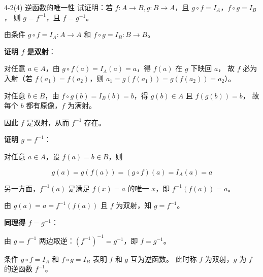 \documentclass[11pt]{article}
\begin{document}

\begin{question}{4-2(4) 逆函数的唯一性}
  试证明：若 $f: A \to B, g: B \to A$，且 $g \circ f = I_A$，$f \circ g = I_B$，
  则 $g = f^{-1}$，且 $f = g^{-1}$。

  \begin{answer}
    由条件 $g \circ f = I_A: A \to A$ 和 $f \circ g = I_B: B \to B$。

    \vspace{0.5em}
    \textbf{证明 $f$ 是双射}：

    对任意 $a \in A$，由 $g \circ f(a) = I_A(a) = a$，得 $f(a)$ 在 $g$ 下映回 $a$，
    故 $f$ 必为入射（若 $f(a_1) = f(a_2)$，则 $a_1 = g(f(a_1)) = g(f(a_2)) = a_2$）。

    对任意 $b \in B$，由 $f \circ g(b) = I_B(b) = b$，得 $g(b) \in A$ 且 $f(g(b)) = b$，
    故每个 $b$ 都有原像，$f$ 为满射。

    因此 $f$ 是双射，从而 $f^{-1}$ 存在。

    \vspace{0.5em}
    \textbf{证明 $g = f^{-1}$}：

    对任意 $a \in A$，设 $f(a) = b \in B$，则

    $$g(a) = g(f(a)) = (g \circ f)(a) = I_A(a) = a$$

    另一方面，$f^{-1}(a)$ 是满足 $f(x) = a$ 的唯一 $x$，即 $f^{-1}(f(a)) = a$。

    由 $g(a) = a = f^{-1}(f(a))$ 且 $f$ 为双射，知 $g = f^{-1}$。

    \vspace{0.5em}
    \textbf{同理得 $f = g^{-1}$}：

    由 $g = f^{-1}$ 两边取逆：$(f^{-1})^{-1} = g^{-1}$，即 $f = g^{-1}$。

    \begin{info}[几何意义:]
      条件 $g \circ f = I_A$ 和 $f \circ g = I_B$ 表明 $f$ 和 $g$ 互为逆函数。
      此时称 $f$ 为双射，$g$ 为 $f$ 的逆函数 $f^{-1}$。
    \end{info}
  \end{answer}
\end{question}
\end{document}
